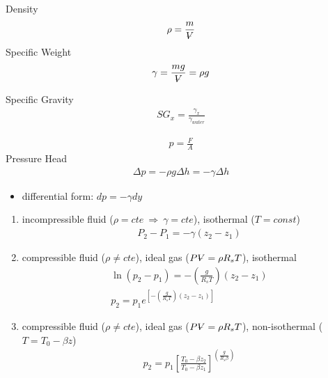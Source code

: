 
Density
\begin{equation*}
    \rho = \frac{m}{\volume}
\end{equation*} 
Specific Weight
\begin{align*}
    \gamma = \frac{mg}{\volume} = \rho g
\end{align*}

Specific Gravity
\begin{align*}
    SG_x = \frac{\gamma_x}{\gamma_{water}}
\end{align*}

\begin{align*}
    p = \frac{F}{A}
\end{align*}
Pressure Head
\begin{align*}
    \Delta p = -\rho g \Delta h = -\gamma \Delta h
\end{align*}
\begin{itemize}
    \item differential form: $dp = -\gamma dy$
\end{itemize}
\begin{enumerate}
    \item incompressible fluid ($\rho=cte \ \Rightarrow \ \gamma=cte$), isothermal ($T=const$)
    \begin{align*}
        P_2 - P_1 = -\gamma(z_2-z_1)
    \end{align*}
    \item compressible fluid ($\rho \neq cte$), ideal gas ($P\volume = \rho R_s T$), isothermal
    \begin{align*}
        \ln (p_2-p_1) = -\left(\frac{g}{R_sT}\right)(z_2-z_1)\\
        p_2 = p_1 e^{\left[-\left(\frac{g}{R_sT}\right)(z_2-z_1)\right]}
    \end{align*}
    \item compressible fluid ($\rho \neq cte$), ideal gas ($P\volume = \rho R_s T$), non-isothermal ($T  = T_{0} - \beta z$)
    \begin{align*}
        p_2 = p_1\left[\frac{T_0 - \beta z_2}{T_0 - \beta z_1}\right]^{\left(\frac{g}{R_s \beta}\right)}
    \end{align*}
\end{enumerate}

